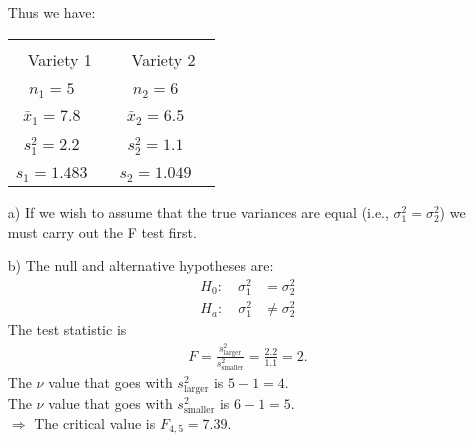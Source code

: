 \documentclass[12pt]{article}
\begin{document}
{\begin{minipage}[t]{0.98\textwidth}
\begin{minipage}[t]{0.47\textwidth}
\begin{enumerate}[a)]
\begin{align*}
\end{align*}
\end{enumerate}
\end{minipage}\hspace{0.04\textwidth}
\begin{minipage}[t]{0.47\textwidth}
\quad\\[-1cm]
\begin{enumerate}
\item[] Thus we have:
\begin{center}
\begin{tabular}{|cc|cc|}
\hline
&&&\\[-0.4cm]
\multicolumn{2}{|c|}{Variety 1} & \multicolumn{2}{|c|}{Variety 2} \\
\hline
&&&\\[-0.4cm]
$n_1 = 5$   && $n_2 = 6$  & \\[0.2cm]
\hline
&&&\\[-0.4cm]
$\bar x_1 = 7.8$  && $\bar x_2 = 6.5$ &   \\[0.2cm]
\hline
&&&\\[-0.4cm]
$s_1^2 = 2.2$   && $s_2^2 = 1.1$  & \\[0.2cm]
\hline
&&&\\[-0.4cm]
$s_1 = 1.483$   && $s_2 = 1.049$  & \\[0.2cm]
\hline
\end{tabular}
\end{center}
\item[a)] If we wish to assume that the true variances are equal (i.e., $\sigma_1^2 = \sigma_2^2$) we must carry out the F test first.
\item[b)] The null and alternative hypotheses are:
\begin{align*}
H_0:\quad \sigma_1^2 &= \sigma_2^2 \\
H_a:\quad \sigma_1^2 &\ne \sigma_2^2
\end{align*}
The test statistic is
\begin{align*}
F = \frac{s_{\text{larger}}^2}{s_{\text{smaller}}^2} = \frac{2.2}{1.1} = 2.
\end{align*}
The $\nu$ value that goes with $s_{\text{larger}}^2$ is $5-1=4$.\\[0.1cm]
The $\nu$ value that goes with $s_{\text{smaller}}^2$ is $6-1=5$.\\[0.4cm]
$\Rightarrow$ The critical value is $F_{4,5} = 7.39$.
\end{enumerate}
\end{minipage}
\end{minipage}}\vspace{0.03\textwidth}
\end{document}
